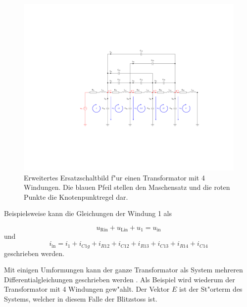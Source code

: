 \begin{refsection}
\begin{figure}
	\centering
	\includegraphics[width=\hsize]{./trafo/images/orig_trafo.pdf}
	\caption[Erweitertes Ersatzschaltbild f"ur einen Transformator mit Maschensatz und Knotenpunkt]{Erweitertes Ersatzschaltbild f"ur einen Transformator mit 4 Windungen. Die blauen Pfeil stellen den Maschensatz und die roten Punkte die Knotenpunktregel dar.}
	\label{trafo:orig}
\end{figure}

Beispielsweise kann die Gleichungen der Windung 1 als 

\begin{equation}
	u_\mathrm{Rin} + u_\mathrm{Lin} + u_1 = u_\mathrm{in}
\end{equation}
und 
\begin{equation}
	i_\mathrm{in} = i_1 + i_{C1g} + i_{R12} + i_{C12} + i_{R13} + i_{C13} + i_{R14} + i_{C14}
\end{equation}
geschrieben werden. 

Mit einigen Umformungen kann der ganze Transformator als System mehreren Differentialgleichungen geschrieben werden \cite{trafo:SeminarCHR}. Als Beispiel wird wiederum der Transformator mit 4 Windungen gew"ahlt. Der Vektor $E$ ist der St"orterm des Systems, welcher in diesem Falle der Blitzstoss ist.


\end{refsection}

